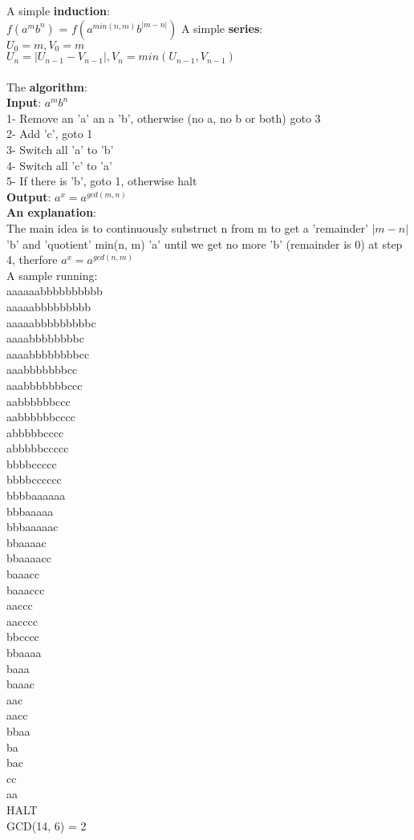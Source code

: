 \documentclass{article}
\begin{document}
\noindent A simple \textbf{induction}:\\
$f(a^mb^n)$ = $f(a^{min(n, m)}b^{|m - n|})$
A simple \textbf{series}:\\
$U_0  = m, V_0 = m$\\
$U_n = |U_{n-1} - V_{n-1}|, V_n = min(U_{n-1}, V_{n-1})$\\\\
The \textbf{algorithm}:\\
\textbf{Input}: $a^mb^n$\\
1- Remove an 'a' an a 'b', otherwise (no a, no b or both) goto 3\\
2- Add 'c', goto 1\\
3- Switch all 'a' to 'b'\\
4- Switch all 'c' to 'a'\\
5- If there is 'b', goto 1, otherwise halt\\
\textbf{Output}: $a^x = a^{gcd(m, n)}$\\

\textbf{An explanation}:\\
The main idea is to continuously substruct n from m to get
a 'remainder' $|m - n|$ 'b' and  'quotient'  min(n, m)  'a'
until we get no more 'b' (remainder is 0) at step 4, therfore
$a^x = a^{gcd(n, m)}$\\


 \noindent A sample running:\\
aaaaaabbbbbbbbbb\\
aaaaabbbbbbbbb\\
aaaaabbbbbbbbbc\\
aaaabbbbbbbbc\\
aaaabbbbbbbbcc\\
aaabbbbbbbcc\\
aaabbbbbbbccc\\
aabbbbbbccc\\
aabbbbbbcccc\\
abbbbbcccc\\
abbbbbccccc\\
bbbbccccc\\
bbbbcccccc\\
bbbbaaaaaa\\
bbbaaaaa\\
bbbaaaaac\\
bbaaaac\\
bbaaaacc\\
baaacc\\
baaaccc\\
aaccc\\
aacccc\\
bbcccc\\
bbaaaa\\
baaa\\
baaac\\
aac\\
aacc\\
bbaa\\
ba\\
bac\\
cc\\
aa\\
HALT\\
GCD(14, 6) = 2
\end{document}

